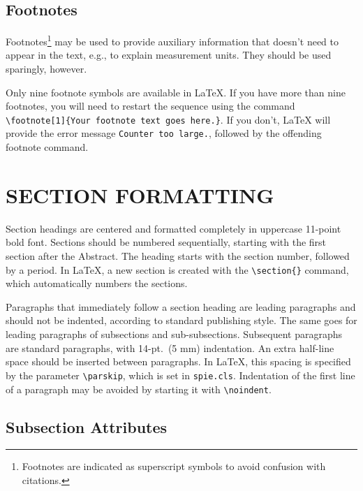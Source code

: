 \documentclass[a4paper]{spie}  %
\begin{document}
\subsection{Footnotes} 
Footnotes\footnote{Footnotes are indicated as superscript symbols to avoid confusion with citations.} may be used to provide auxiliary information that doesn't need to appear in the text, e.g., to explain measurement units.  They should be used sparingly, however.  

Only nine footnote symbols are available in LaTeX. If you have more than nine footnotes, you will need to restart the sequence using the command  \verb|\footnote[1]{Your footnote text goes here.}|. If you don't, LaTeX will provide the error message {\tt Counter too large.}, followed by the offending footnote command.

\section{SECTION FORMATTING} \label{sec:sections}

Section headings are centered and formatted completely in uppercase 11-point bold font.  Sections should be numbered sequentially, starting with the first section after the Abstract.  The heading starts with the section number, followed by a period.  In LaTeX, a new section is created with the \verb|\section{}| command, which automatically numbers the sections.

Paragraphs that immediately follow a section heading are leading paragraphs and should not be indented, according to standard publishing style\cite{Lamport94}.  The same goes for leading paragraphs of subsections and sub-subsections.  Subsequent paragraphs are standard paragraphs, with 14-pt.\ (5 mm) indentation.  An extra half-line space should be inserted between paragraphs.  In LaTeX, this spacing is specified by the parameter \verb|\parskip|, which is set in {\tt spie.cls}.  Indentation of the first line of a paragraph may be avoided by starting it with \verb|\noindent|.
 
\subsection{Subsection Attributes} 
\end{document}
